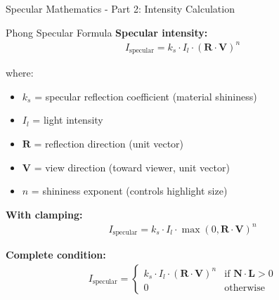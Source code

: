 \begin{frame}{Specular Mathematics - Part 2: Intensity Calculation}
  \begin{mathbox}{Phong Specular Formula}
    \textbf{Specular intensity:}
    \begin{align}
      I_{\text{specular}} = k_s \cdot I_l \cdot (\mathbf{R} \cdot \mathbf{V})^n
    \end{align}

    where:
    \begin{itemize}
      \item $k_s$ = specular reflection coefficient (material shininess)
      \item $I_l$ = light intensity
      \item $\mathbf{R}$ = reflection direction (unit vector)
      \item $\mathbf{V}$ = view direction (toward viewer, unit vector)
      \item $n$ = shininess exponent (controls highlight size)
    \end{itemize}

    \vspace{0.3cm}
    \pause
    \textbf{With clamping:}
    \begin{align}
      I_{\text{specular}} = k_s \cdot I_l \cdot \max(0, \mathbf{R} \cdot \mathbf{V})^n
    \end{align}

    \pause
    \textbf{Complete condition:}
    \begin{align}
      I_{\text{specular}} =
      \begin{cases}
        k_s \cdot I_l \cdot (\mathbf{R} \cdot \mathbf{V})^n & \text{if } \mathbf{N} \cdot \mathbf{L} > 0 \\
        0 & \text{otherwise}
      \end{cases}
    \end{align}
  \end{mathbox}
\end{frame}

